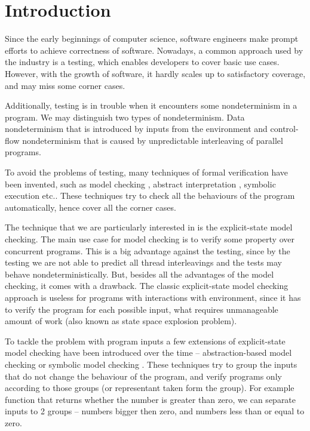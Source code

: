 \chapter{Introduction}\label{ch:Introduction}


\noindent
Since the early beginnings of computer science, software engineers make prompt
efforts to achieve correctness of software. Nowadays, a common approach used by
the industry is a testing, which enables developers to cover basic use cases.
However, with the growth of software, it hardly scales up to satisfactory
coverage, and may miss some corner cases.

Additionally, testing is in trouble when it encounters some nondeterminism in a
program. We may distinguish two types of nondeterminism. Data nondeterminism
that is introduced by inputs from the environment and control-flow
nondeterminism that is caused by unpredictable interleaving of parallel
programs.

To avoid the problems of testing, many techniques of formal verification have
been invented, such as model checking \cite{Baier08}, abstract interpretation
\cite{Cousot14}, symbolic execution \cite{King76} etc.. These techniques try to
check all the behaviours of the program automatically, hence cover all the
corner cases.

The technique that we are particularly interested in is the explicit-state model
checking.  The main use case for model checking is to verify
some property over concurrent programs. This is a big advantage against
the testing, since by the testing we are not able to predict all thread
interleavings and the tests may behave nondeterministically. But,
besides all the advantages of the model checking, it comes with a
drawback. The classic explicit-state model checking approach is useless
for programs with interactions with environment, since it has to verify
the program for each possible input, what requires unmanageable amount
of work (also known as state space explosion problem).

To tackle the problem with program inputs a few extensions of explicit-state
model checking have been introduced over the time -- abstraction-based model
checking \cite{Clarke94} or symbolic model checking \cite{Clarke96}.  These
techniques try to group the inputs that do not change the behaviour of the
program, and verify programs only according to those groups (or representant
taken form the group). For example function that returns whether the
number is greater than zero, we can separate inputs to 2 groups -- numbers
bigger then zero, and numbers less than or equal to zero.

